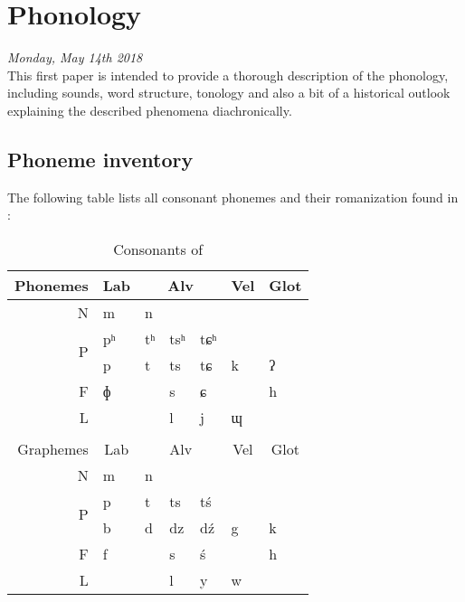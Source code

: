 \section{Phonology}
\emph{Monday, May 14th 2018}\\

\noindent This first paper is intended to provide a thorough description of the \lang{} phonology, including sounds, word structure, tonology and also a bit of a historical outlook explaining the described phenomena diachronically.

\subsection{Phoneme inventory}
The following table lists all consonant phonemes and their romanization found in \lang{}:
\begin{table}[H]
\centering
\begin{tabular}{r|l|lll|l|l}
Phonemes           & \multicolumn{1}{c|}{Lab} & \multicolumn{3}{c|}{Alv} & \multicolumn{1}{c|}{Vel} & \multicolumn{1}{c}{Glot} \\ \hline
N                  & m                        & n      &        &        &                          &                          \\
\multirow{2}{*}{P} & pʰ                       & tʰ     & tsʰ    & tɕʰ    &                          &                          \\
                   & p                        & t      & ts     & tɕ     & k                        & ʔ                        \\
F                  & ɸ                        &        & s      & ɕ      &                          & h                        \\
L                  &                          &        & l      & j      & ɰ                        & \\
\multicolumn{1}{c}{}\\                        
Graphemes          & \multicolumn{1}{c|}{Lab} & \multicolumn{3}{c|}{Alv} & \multicolumn{1}{c|}{Vel} & \multicolumn{1}{c}{Glot} \\ \hline
N                  & m                        & n      &        &        &                          &                          \\
\multirow{2}{*}{P} & p                        & t      & ts     & tś     &                          &                          \\
                   & b                        & d      & dz     & dź     & g & k                        \\
F                  & f                        &        & s      & ś      &                          & h                        \\
L                  &                          &        & l      & y      & w                        &                         
\end{tabular}
\label{consonants}
\caption{Consonants of \lang{}}
\end{table}

